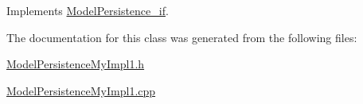 Implements \hyperlink{class_model_persistence__if_afb8e1011e873757febfb0d055d592d38}{Model\-Persistence\-\_\-if}.



The documentation for this class was generated from the following files\-:\begin{DoxyCompactItemize}
\item 
\hyperlink{_model_persistence_my_impl1_8h}{Model\-Persistence\-My\-Impl1.\-h}\item 
\hyperlink{_model_persistence_my_impl1_8cpp}{Model\-Persistence\-My\-Impl1.\-cpp}\end{DoxyCompactItemize}
